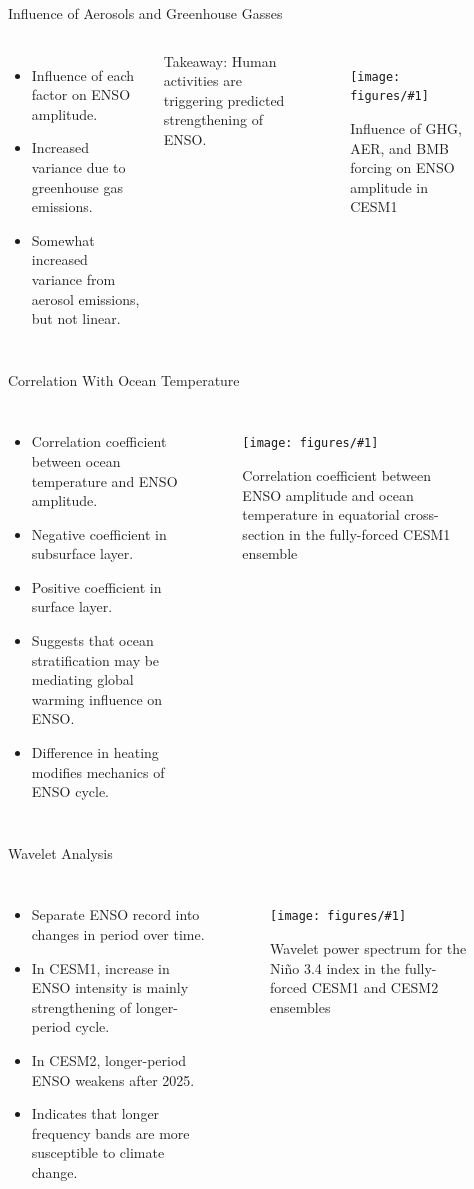 \documentclass{beamer}
\newcommand{\myfig}[3]{
  \begin{figure}
    \centering
    \texttt{[image: figures/\#1]}
    \caption{#2}
    \label{fig:#3}
  \end{figure}
}
\begin{document}
\begin{frame}{Influence of Aerosols and Greenhouse Gasses}
  \begin{columns}
    \begin{itemize}
    \item Influence of each factor on ENSO amplitude.
    \item Increased variance due to greenhouse gas emissions.
    \item Somewhat increased variance from aerosol emissions, but not linear.
    \end{itemize}
    \alert{Takeaway:} Human activities are triggering predicted strengthening of ENSO.
    \myfig{cesm1_sf_4.pdf}{Influence of GHG, AER, and BMB forcing on ENSO amplitude in CESM1}{cesm1_sf_4}
  \end{columns}
\end{frame}

\begin{frame}{Correlation With Ocean Temperature}
  \begin{columns}
    \begin{itemize}
    \item Correlation coefficient between ocean temperature and ENSO amplitude.
    \item Negative coefficient in subsurface layer.
    \item Positive coefficient in surface layer.
    \item Suggests that ocean stratification may be mediating global warming influence on ENSO.
    \item Difference in heating modifies mechanics of ENSO cycle.
    \end{itemize}
    \myfig{tempdt.pdf}{Correlation coefficient between ENSO amplitude and ocean temperature in equatorial cross-section in the fully-forced CESM1 ensemble}{tempdt}
  \end{columns}
\end{frame}

\begin{frame}{Wavelet Analysis}
  \begin{columns}
    \begin{itemize}
    \item Separate ENSO record into changes in period over time.
    \item In CESM1, increase in ENSO intensity is mainly strengthening of longer-period cycle.
    \item In CESM2, longer-period ENSO weakens after 2025.
    \item Indicates that longer frequency bands are more susceptible to climate change.
    \end{itemize}
    \myfig{wavelet3.pdf}{Wavelet power spectrum for the Niño 3.4 index in the fully-forced CESM1 and CESM2 ensembles}{wavelet2}
  \end{columns}
\end{frame}
\end{document}

